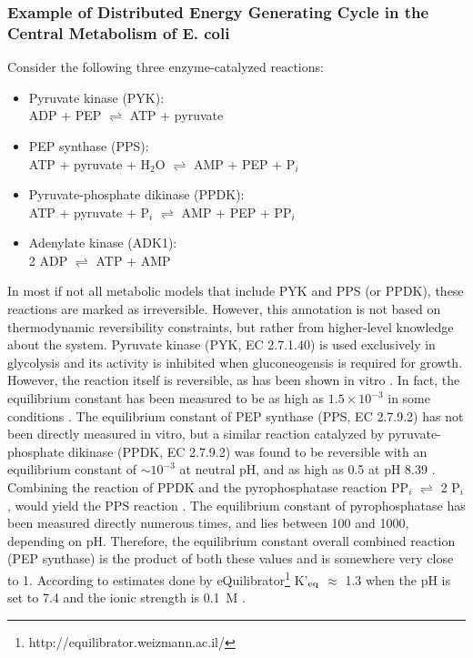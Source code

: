 \documentclass[twocolumn]{article}
\begin{document}
\subsubsection{Example of Distributed Energy Generating Cycle in the Central Metabolism of E. coli}
Consider the following three enzyme-catalyzed reactions:
\begin{itemize}
	\item Pyruvate kinase (PYK):\\ADP + PEP $\rightleftharpoons$ ATP + pyruvate
	\item PEP synthase (PPS):\\ATP + pyruvate + H$_2$O $\rightleftharpoons$ AMP + PEP + P$_i$
	\item Pyruvate-phosphate dikinase (PPDK):\\ATP + pyruvate + P$_i$ $\rightleftharpoons$ AMP + PEP + PP$_i$
	\item Adenylate kinase (ADK1):\\2 ADP $\rightleftharpoons$ ATP + AMP
\end{itemize}
In most if not all metabolic models that include PYK and PPS (or PPDK), these reactions are marked as irreversible. However, this annotation is not based on thermodynamic reversibility constraints, but rather from higher-level knowledge about the system. Pyruvate kinase (PYK, EC 2.7.1.40) is used exclusively in glycolysis and its activity is inhibited when gluconeogensis is required for growth. However, the reaction itself is reversible, as has been shown in vitro \cite{Lardy1945-ze}. In fact, the equilibrium constant has been measured to be as high as $1.5 \times 10^{-3}$ in some conditions \cite{Krimsky1959-mt}. The equilibrium constant of PEP synthase (PPS, EC 2.7.9.2) has not been directly measured in vitro, but a similar reaction catalyzed by pyruvate-phosphate dikinase (PPDK, EC 2.7.9.2) was found to be reversible with an equilibrium constant of $\sim10^{-3}$ at neutral pH, and as high as 0.5 at pH 8.39 \cite{Reeves1968-mq}. Combining the reaction of PPDK and the pyrophosphatase reaction PP$_i$ $\rightleftharpoons$ 2 P$_i$, would yield the PPS reaction \cite{De_Meis1982-pe}. The equilibrium constant of pyrophosphatase has been measured directly numerous times, and lies between 100 and 1000, depending on pH. Therefore, the equilibrium constant overall combined reaction (PEP synthase) is the product of both these values and is somewhere very close to 1. According to estimates done by eQuilibrator\footnote{http://equilibrator.weizmann.ac.il/} K'$_{\rm eq}$ $\approx$ 1.3 when the pH is set to 7.4 and the ionic strength is 0.1~M \cite{Flamholz2011}.
\end{document}
